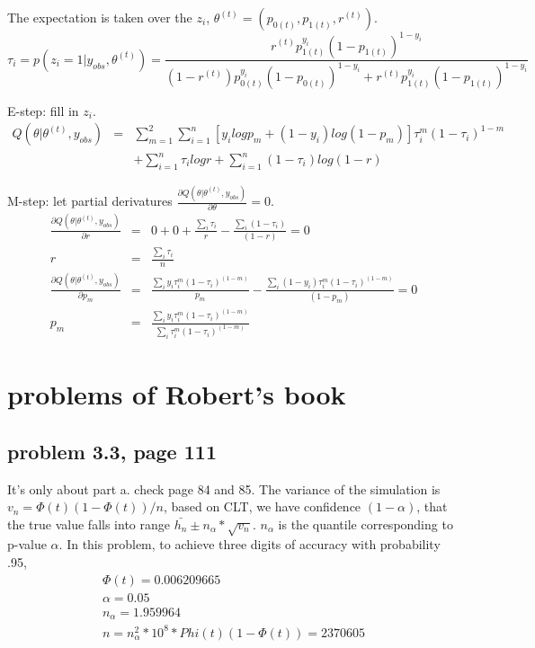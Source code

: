 \documentclass[a4paper,10pt]{article}
\begin{document}
The expectation is taken over the $z_i$, $\theta^{(t)} = (p_{0(t)}, p_{1(t)}, r^{(t)} )$.
\begin{displaymath}
\tau_i = p(z_i=1 | y_{obs}, \theta^{(t)}) =  \frac{r^{(t)} p_{1(t)}^{y_i} (1-p_{1(t)})^{1-y_i} } {(1-r^{(t)}) p_{0(t)}^{y_i} (1-p_{0(t)})^{1-y_i} + r^{(t)} p_{1(t)}^{y_i} (1-p_{1(t)})^{1-y_i} }
\end{displaymath}

E-step: fill in $z_i$.
\begin{eqnarray*}
Q(\theta | \theta^{(t)}, y_{obs} ) &=& \sum_{m=1}^2 \sum_{i=1}^n [y_i log p_m + (1-y_i) log(1-p_m)] \tau_i^m (1-\tau_i)^{1-m} \\
&& + \sum_{i=1}^n \tau_i log r + \sum_{i=1}^n (1-\tau_i) log (1-r)
\end{eqnarray*}

M-step: let partial derivatures $\frac{\partial Q(\theta | \theta^{(t)}, y_{obs} ) } {\partial \theta} = 0$.
\begin{eqnarray}
\frac{\partial Q(\theta | \theta^{(t)}, y_{obs} ) } {\partial r} & = & 0 + 0 + \frac{\sum_i\tau_i}{r} - \frac{\sum_i(1-\tau_i)}{(1-r)}= 0 \nonumber \\
r & = & \frac{\sum_i \tau_i}{n} \\
\frac{\partial Q(\theta | \theta^{(t)}, y_{obs} ) } {\partial p_m } & = & \frac{\sum_i y_i\tau_i^m (1-\tau_i)^{(1-m)} }{p_m} - \frac{\sum_i (1-y_i)\tau_i^m (1-\tau_i)^{(1-m)}}{(1-p_m)} = 0 \nonumber \\
p_m & = & \frac{\sum_i y_i \tau_i^m (1-\tau_i)^{(1-m)} }{ \sum_i \tau_i^m (1-\tau_i)^{(1-m)} }
\end{eqnarray}

\section{problems of Robert's book}
\subsection{problem 3.3, page 111}
It's only about part a. check page 84 and 85. The variance of the simulation is $v_n = \Phi(t)(1-\Phi(t))/n$, based on CLT, we have confidence $(1-\alpha)$, that the true value falls into range $\bar{h_n} \pm n_\alpha*\sqrt{v_n}$. $n_\alpha$ is the quantile corresponding to p-value $\alpha$. In this problem, to achieve three digits of accuracy with probability .95,
\begin{eqnarray}
\Phi(t) = 0.006209665 \nonumber \\
\alpha = 0.05 \nonumber \\
n_\alpha = 1.959964 \nonumber \\
n = n_\alpha^2 * 10^8 * Phi(t)(1-\Phi(t)) = 2370605 \nonumber
\end{eqnarray}
\end{document}
